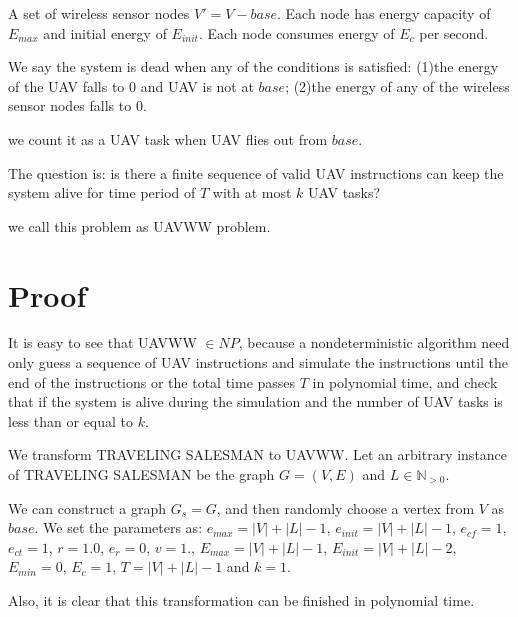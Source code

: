 \documentclass[11pt]{article}
\begin{document}
A set of wireless sensor nodes $V' = V - {base}$. Each node has energy capacity of $E_{max}$ and initial energy of $E_{init}$. Each node consumes energy of $E_{c}$ per second.

We say the system is dead when any of the conditions is satisfied:
(1)the energy of the UAV falls to 0 and UAV is not at $base$;
(2)the energy of any of the wireless sensor nodes falls to 0.

we count it as a UAV task when UAV flies out from $base$.

The question is: is there a finite sequence of valid UAV instructions can keep the system alive for time period of $T$ with at most $k$ UAV tasks?

we call this problem as UAVWW problem.

\section{Proof}
It is easy to see that UAVWW $\in NP$, because a nondeterministic algorithm need only guess a sequence of UAV instructions and simulate the instructions until the end of the instructions or the total time passes $T$ in polynomial time, and check that if the system is alive during the simulation and the number of UAV tasks is less than or equal to $k$.

We transform TRAVELING SALESMAN to UAVWW. Let an arbitrary instance of TRAVELING SALESMAN be the graph $G = (V, E)$ and $L \in \mathbb{N}_{>0}$.

We can construct a graph $G_s = G$, and then randomly choose a vertex from $V$ as $base$. We set the parameters as: $e_{max} = |V| + |L| - 1$, $e_{init} = |V| + |L| - 1$, $e_{cf} = 1$, $e_{ct} = 1$, $r = 1.0$, $e_r = 0$, $v = 1$., $E_{max} = |V| + |L| - 1$, $E_{init} = |V| + |L| - 2$, $E_{min} = 0$, $E_{c} = 1$, $T = |V| + |L| - 1$ and $k = 1$.

Also, it is clear that this transformation can be finished in polynomial time.
\end{document}
